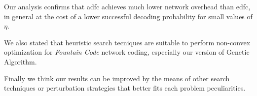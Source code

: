 \documentclass[12pt,journal,draftclsnofoot,onecolumn]{IEEEtran}
\begin{document}
Our analysis confirms that \gls{adfc} achieves much lower network overhead than \gls{edfc}, in general at the cost of a lower successful decoding probability for small values of $\eta$.

We also stated that heuristic search tecniques are suitable to perform non-convex optimization for \emph{Fountain Code} network coding, especially our version of Genetic Algorithm.

Finally we think our results can be improved by the means of other search techniques or perturbation strategies that better fits each problem peculiarities.



\end{document}
